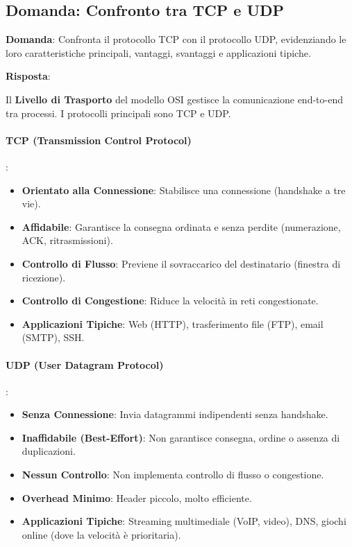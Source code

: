 
\subsection*{Domanda: Confronto tra TCP e UDP}

\textbf{Domanda}: Confronta il protocollo TCP con il protocollo UDP, evidenziando le loro caratteristiche principali, vantaggi, svantaggi e applicazioni tipiche.

\textbf{Risposta}:

Il \textbf{Livello di Trasporto} del modello OSI gestisce la comunicazione end-to-end tra processi. I protocolli principali sono TCP e UDP.
\paragraph{TCP (Transmission Control Protocol)}:
\begin{itemize}
    \item \textbf{Orientato alla Connessione}: Stabilisce una connessione (handshake a tre vie).
    \item \textbf{Affidabile}: Garantisce la consegna ordinata e senza perdite (numerazione, ACK, ritrasmissioni).
    \item \textbf{Controllo di Flusso}: Previene il sovraccarico del destinatario (finestra di ricezione).
    \item \textbf{Controllo di Congestione}: Riduce la velocità in reti congestionate.
    \item \textbf{Applicazioni Tipiche}: Web (HTTP), trasferimento file (FTP), email (SMTP), SSH.
\end{itemize}
\paragraph{UDP (User Datagram Protocol)}:
\begin{itemize}
    \item \textbf{Senza Connessione}: Invia datagrammi indipendenti senza handshake.
    \item \textbf{Inaffidabile (Best-Effort)}: Non garantisce consegna, ordine o assenza di duplicazioni.
    \item \textbf{Nessun Controllo}: Non implementa controllo di flusso o congestione.
    \item \textbf{Overhead Minimo}: Header piccolo, molto efficiente.
    \item \textbf{Applicazioni Tipiche}: Streaming multimediale (VoIP, video), DNS, giochi online (dove la velocità è prioritaria).
\end{itemize}